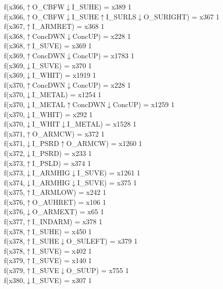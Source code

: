 f(x366,$\uparrow$O\_CBFW$\downarrow$I\_SUHE) = x389 {1} \\
f(x366,$\uparrow$O\_CBFW$\downarrow$I\_SUHE$\uparrow$I\_SURLS$\downarrow$O\_SURIGHT) = x367 {1} \\
f(x367,$\uparrow$I\_ARMRET) = x368 {1} \\
f(x368,$\uparrow$ConcDWN$\downarrow$ConcUP) = x228 {1} \\
f(x368,$\uparrow$I\_SUVE) = x369 {1} \\
f(x369,$\uparrow$ConcDWN$\downarrow$ConcUP) = x1783 {1} \\
f(x369,$\downarrow$I\_SUVE) = x370 {1} \\
f(x369,$\downarrow$I\_WHIT) = x1919 {1} \\
f(x370,$\uparrow$ConcDWN$\downarrow$ConcUP) = x228 {1} \\
f(x370,$\downarrow$I\_METAL) = x1254 {1} \\
f(x370,$\downarrow$I\_METAL$\uparrow$ConcDWN$\downarrow$ConcUP) = x1259 {1} \\
f(x370,$\downarrow$I\_WHIT) = x292 {1} \\
f(x370,$\downarrow$I\_WHIT$\downarrow$I\_METAL) = x1528 {1} \\
f(x371,$\uparrow$O\_ARMCW) = x372 {1} \\
f(x371,$\downarrow$I\_PSRD$\uparrow$O\_ARMCW) = x1260 {1} \\
f(x372,$\downarrow$I\_PSRD) = x233 {1} \\
f(x373,$\uparrow$I\_PSLD) = x374 {1} \\
f(x373,$\downarrow$I\_ARMHIG$\downarrow$I\_SUVE) = x1261 {1} \\
f(x374,$\downarrow$I\_ARMHIG$\downarrow$I\_SUVE) = x375 {1} \\
f(x375,$\uparrow$I\_ARMLOW) = x242 {1} \\
f(x376,$\uparrow$O\_AUHRET) = x106 {1} \\
f(x376,$\downarrow$O\_ARMEXT) = x65 {1} \\
f(x377,$\uparrow$I\_INDARM) = x378 {1} \\
f(x378,$\uparrow$I\_SUHE) = x450 {1} \\
f(x378,$\uparrow$I\_SUHE$\downarrow$O\_SULEFT) = x379 {1} \\
f(x378,$\uparrow$I\_SUVE) = x402 {1} \\
f(x379,$\uparrow$I\_SUVE) = x140 {1} \\
f(x379,$\uparrow$I\_SUVE$\downarrow$O\_SUUP) = x755 {1} \\
f(x380,$\downarrow$I\_SUVE) = x307 {1} \\
